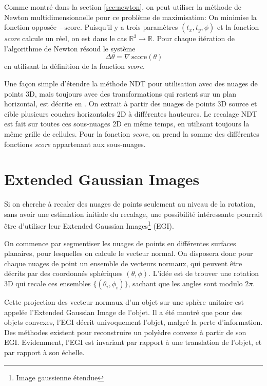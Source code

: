 \documentclass[a4paper,10pt]{scrreprt}
\begin{document}
Comme montré dans la section \ref{sec:newton}, on peut utiliser la méthode de Newton multidimensionnelle pour ce problème de maximisation: On minimise la fonction opposée $- \text{score}$. Puisqu'il y a trois paramètres $(t_x, t_y, \phi)$ et la fonction \emph{score} calcule un réel, on est dans le cas $\mathbb{R}^3 \rightarrow \mathbb{R}$. Pour chaque itération de l'algorithme de Newton résoud le système
\begin{equation}
	[\mathbf{H} \, \text{score}(\theta)] \, \Delta \theta = \nabla \, \text{score}(\theta)
\end{equation}
en utilisant la définition de la fonction \emph{score}.

Une façon simple d'étendre la méthode NDT pour utilisation avec des nuages de points 3D, mais toujours avec des transformations qui restent sur un plan horizontal, est décrite en \cite{Dold2007}. On extrait à partir des nuages de points 3D source et cible plusieurs couches horizontales 2D à différentes hauteures. Le recalage NDT est fait sur toutes ces sous-nuages 2D en même temps, en utilisant toujours la même grille de cellules. Pour la fonction \emph{score}, on prend la somme des différentes fonctions \emph{score} appartenant aux sous-nuages.


\section{Extended Gaussian Images}
Si on cherche à recaler des nuages de points seulement au niveau de la rotation, sans avoir une estimation initiale du recalage, une possibilité intéressante pourrait être d'utiliser leur Extended Gaussian Images\footnote{Image gaussienne étendue} (EGI).

On commence par segmentiser les nuages de points en différentes surfaces planaires, pour lesquelles on calcule le vecteur normal. On disposera donc pour chaque nuages de point un ensemble de vecteurs normaux, qui peuvent être décrits par des coordonnés sphériques $(\theta, \phi)$. L'idée est de trouver une rotation 3D qui recale ces ensembles $\{(\theta_i, \phi_i)\}$, sachant que les angles sont modulo $2 \pi$.

Cette projection des vecteur normaux d'un objet sur une sphère unitaire est appelée l'Extended Gaussian Image de l'objet. \cite{Horn1984} Il a été montré que pour des objets convexes, l'EGI décrit univoquement l'objet, malgré la perte d'information. Des méthodes existent pour reconstruire un polyèdre convexe à partir de son EGI. Evidemment, l'EGI est invariant par rapport à une translation de l'objet, et par rapport à son échelle.
\end{document}
